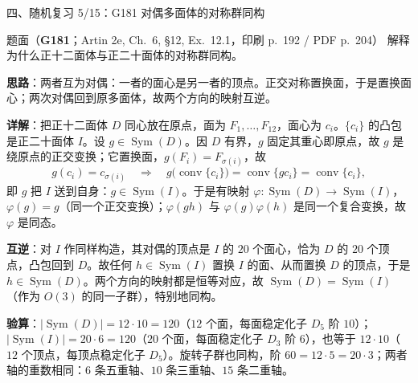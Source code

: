 \documentclass[aspectratio=169,10pt,fontset=none]{ctexbeamer}
\newcommand{\ex}[1]{\textcolor{accent}{\footnotesize\bfseries #1}}
\newcommand{\key}[1]{\textcolor{ink}{\bfseries #1}}
\begin{document}
\begin{frame}[t]{四、随机复习 5/15：G181 对偶多面体的对称群同构}
\label{ex:G181}
\scriptsize
\begin{block}{\footnotesize 题面（\ex{G181}；Artin 2e, Ch.~6, §12, Ex.~12.1，印刷 p.~192 / PDF p.~204）}
解释为什么正十二面体与正二十面体的对称群同构。
\end{block}
\key{思路}：两者互为对偶：一者的面心是另一者的顶点。正交对称置换面，于是置换面心；两次对偶回到原多面体，故两个方向的映射互逆。

\key{详解}：把正十二面体 $D$ 同心放在原点，面为 $F_1,\dots,F_{12}$，面心为 $c_i$。$\{c_i\}$ 的凸包是正二十面体 $I$。设 $g\in\operatorname{Sym}(D)$。因 $D$ 有界，$g$ 固定其重心即原点，故 $g$ 是绕原点的正交变换；它置换面，$g(F_i)=F_{\sigma(i)}$，故
\[ g(c_i)=c_{\sigma(i)}\quad\Longrightarrow\quad g\bigl(\operatorname{conv}\{c_i\}\bigr)=\operatorname{conv}\{g c_i\}=\operatorname{conv}\{c_i\}, \]
即 $g$ 把 $I$ 送到自身：$g\in\operatorname{Sym}(I)$。于是有映射 $\varphi:\operatorname{Sym}(D)\to\operatorname{Sym}(I)$，$\varphi(g)=g$（同一个正交变换）；$\varphi(gh)$ 与 $\varphi(g)\varphi(h)$ 是同一个复合变换，故 $\varphi$ 是同态。

\key{互逆}：对 $I$ 作同样构造，其对偶的顶点是 $I$ 的 $20$ 个面心，恰为 $D$ 的 $20$ 个顶点，凸包回到 $D$。故任何 $h\in\operatorname{Sym}(I)$ 置换 $I$ 的面、从而置换 $D$ 的顶点，于是 $h\in\operatorname{Sym}(D)$。两个方向的映射都是恒等对应，故 $\operatorname{Sym}(D)=\operatorname{Sym}(I)$（作为 $O(3)$ 的同一子群），特别地同构。

\key{验算}：$|\operatorname{Sym}(D)|=12\cdot10=120$（$12$ 个面，每面稳定化子 $D_5$ 阶 $10$）；$|\operatorname{Sym}(I)|=20\cdot6=120$（$20$ 个面，每面稳定化子 $D_3$ 阶 $6$），也等于 $12\cdot10$（$12$ 个顶点，每顶点稳定化子 $D_5$）。旋转子群也同构，阶 $60=12\cdot5=20\cdot3$；两者轴的重数相同：$6$ 条五重轴、$10$ 条三重轴、$15$ 条二重轴。
\end{frame}
\end{document}
